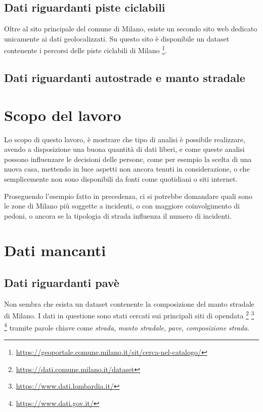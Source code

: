 \documentclass[a4paper]{report}
\begin{document}
\subsection{Dati riguardanti piste ciclabili}
Oltre al sito principale del comune di Milano, esiste un secondo sito web dedicato 
unicamente ai dati geolocalizzati. Su questo sito è disponibile un dataset contenente 
i percorsi delle piste ciclabili di Milano
\footnote{\url{https://geoportale.comune.milano.it/sit/cerca-nel-catalogo/}}.

\subsection{Dati riguardanti autostrade e manto stradale}

\section{Scopo del lavoro}

Lo scopo di questo lavoro, è mostrare che tipo di analisi è possibile realizzare, 
avendo a disposizione 
una buona quantità di dati liberi, e come queste analisi possono influenzare le decisioni delle 
persone, come per esempio la scelta di una nuova casa, mettendo in luce aspetti non ancora 
tenuti in considerazione, o che semplicemente non sono disponibili da fonti 
come quotidiani o siti internet.

Proseguendo l'esempio fatto in precedenza, ci si potrebbe domandare quali sono le zone di Milano 
più soggette a incidenti, o con maggiore coinvolgimento di pedoni, o ancora se la tipologia di strada 
influenza il numero di incidenti.

\section{Dati mancanti}

\subsection{Dati riguardanti pavè}
Non sembra che esista un dataset contenente la composizione del manto stradale di Milano.
I dati in questione sono stati cercati sui principali siti di opendata
\footnote{\url{https://dati.comune.milano.it/dataset}}
\footnote{\url{https://www.dati.lombardia.it/}}
\footnote{\url{https://www.dati.gov.it/}}
tramite parole chiave come \textit{strada}, \textit{manto stradale}, \textit{pave}, 
\textit{composizione strada}.
\end{document}
